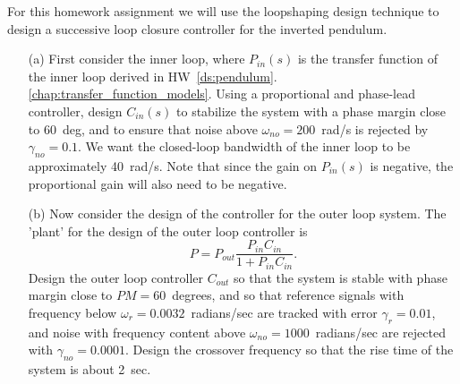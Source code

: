 For this homework assignment we will use the loopshaping design technique to design a successive loop closure controller for the inverted pendulum.
\begin{itemize}
	\item[(a)] First consider the inner loop, where $P_{in}(s)$ is the transfer function of the inner loop derived in HW~\ref{ds:pendulum}.\ref{chap:transfer_function_models}.  Using a proportional and phase-lead controller, design $C_{in}(s)$ to stabilize the system with a phase margin close to 60~deg, and to ensure that noise above $\omega_{no}=200$~rad/s is rejected by $\gamma_{no}=0.1$.  We want the closed-loop bandwidth of the inner loop to be approximately 40~rad/s. Note that since the gain on $P_{in}(s)$ is negative, the proportional gain will also need to be negative.
	\item[(b)] Now consider the design of the controller for the outer loop system.  The 'plant' for the design of the outer loop controller is
		\[
		P = P_{out}\frac{P_{in}C_{in}}{1+P_{in}C_{in}}.
		\]
		Design the outer loop controller $C_{out}$ so that the system is stable with phase margin close to $PM=60$~degrees, and so that reference signals with frequency below $\omega_r=0.0032$~radians/sec are tracked with error $\gamma_r=0.01$, and noise with frequency content above $\omega_{no}=1000$~radians/sec are rejected with $\gamma_{no}=0.0001$. Design the crossover frequency so that the rise time of the system is about 2~sec.
\end{itemize}


